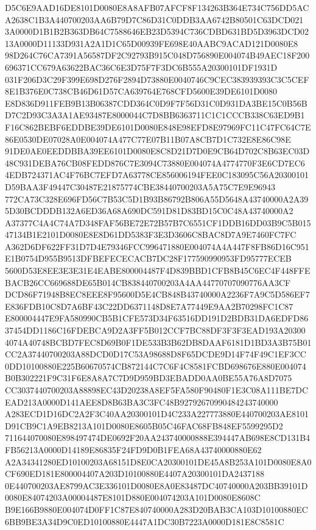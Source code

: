 \documentclass[UTF8,fontset=fandol,zihao=-4,a4paper]{ctexart}
\begin{document}
{{D5C6E9AAD16DE8101D0080E8A8AFB07AFCF8F134263B364E734C756DD5ACA2638C1B3A440700203AA6B79D7C86D31C0DDB3AA6742B80501C63DCD021
3A0000D1B1B2B363DB64C7588646EB23D5394C736CDBD631BD5D3963DCD0213A0000D11133D931A2A1D1C65D00939FE698E40AABC9ACAD121D0080E8
98D264C76CA7391A56587DF2C92793B915C048D756890E004074B49AEC18F200696371CC679A63622BAC36C6E3D75F7F3DC6B555A20300101DF1931D
031F206D3C29F399E698D276F2894D73880E0040746C9CEC383939393C3C5CEF8E1B376E0C738CB46D61D57CA639764E768CFD5600E39DE6101D0080
E8D836D911FEB9B13B06387CDD364C0D9F7F56D31C0D931DA3BE15C0B56BD7C2D93C3A3A1AE93487E8000044C7D8BB6363711C1C1CCCB338C63ED9B1
F16C862BEBF6EDDBE39DE6101D0080E848E98EFD8E97969FC11C47FC64C7E86E0530DE07028A0E004074A477C77E07B11B07A8CB7D1C732E8E86C98E
91DE0AE0EEDDBBA39EE6101D0080E8C8D21D7D0E9CB64D702C8B63EC03D48C931DEBA76CB08FEDD876C7E3094C73880E004074A4774770F3E6CD7EC6
4EDB724371AC4F76BC7EFD7A63778CE856006194FEE0C183095C56A20300101D59BAA3F49447C30487E21875774CBE38440700203A5A75C7E9E96943
772CA73C328E696FD56C7B53C5D1B93B86792B806A55D5648A43740000A2A395D30BCDDDB132A6ED36A68A690DC591D81D83BD15C0C48A43740000A2
A37377C4A4C74A7D348FAF56BE72E72B57B7C6551CF1DDB16DD03B9C5B01547134B1E2101D0080E8E8D61DD5383F3E3D3606C8BAC8D7A9E7460FC7FC
A362D6DF622FF31D7D4E79346FCC996471880E004074A4A447F8FB86D16C951E1B0754D955B9513DFBEFECECACB7DC28F177590990953FD95777ECEB
5600D53E8EE3E3E31E4EABE800004487F4D839BBD1CFB8B45C6EC4F448FFEBACB26CC669688DE65B014CB838440700203A4AA44770707090776AA3CF
DCD86F71948B8EC8EEE8F95600D5E4CB848B43740000A2236F7A9C5D586EF7E836FDB10C8D7A6BF43C22DD6371148D8E7A77449E9AA2B70298FC1C87
E800004447E9FA580990CB5B1CFE573D34F63516DD191D2BDB31DA6EDFD8637454DD1186C16FDEBCA9D2A3FF5B012CCF7BC88DF3F3F3EAD193A20300
4074A40748BCBD7FEC8D69B0F1DE533B3B62DB8DAAF6181D1BD3A3B75B01CC2A37440700203A88DCD0D17C53A98688D8F65DCDE9D14F74F49C1EF3CC
0DD10100880E225B60670574CB872144C7C6F4C8581FCBD698676E880E004074B0B302221F9C31F6E8A8A7C7D9D959BD3EBADD0AA0BE55A76A8D7075
CC3037440700203A88898EC43D20238A8EF5FA580F90480F1E3C08A111BE7DCEAD213A0000D141AEE8D8B63BA3C3FC48B92792670990484243740000
A283ECD1D16DC2A2F3C40AA20300101D4C233A227773880E440700203AE8101D91CB9C1A9EB8213A101D0080E8605B05C46FAC68FB848EF5599295D2
711644070080E898497474DE0692F20AA243740000888E394447AB698E8CD131B4FB56213A0000D14189E86835F24FD9D0B1FEA68A43740000880E62
A2A34341280ED10100203A68151D8E0CA20300101DE45A8B253A101D0080E8A0CF690ED181E800004407A203D10100880E4407A20300101DA2437188
0E440700203AE8799AC3E336101D0080E8A0E83487DC40740000A203BB39101D0080E84074203A00004487E8101D880E004074203A101D0080E8608C
B9E166B9880E004074D0FF1C87E840740000A283D20BAB3CA103D10100880EC6BB9BE3A34D9C0ED10100880E4447A1DC30B7223A0000D181E8C8581C
}}
\end{document}
